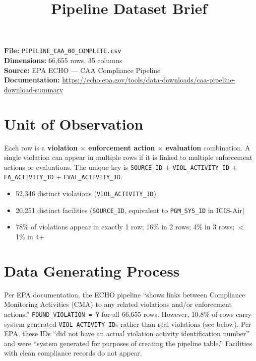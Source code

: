 \documentclass[11pt]{article}
\title{Pipeline Dataset Brief}
\author{}
\date{}
\begin{document}
\maketitle

\noindent\textbf{File:} \texttt{PIPELINE\_CAA\_00\_COMPLETE.csv} \\
\textbf{Dimensions:} 66,655 rows, 35 columns \\
\textbf{Source:} EPA ECHO --- CAA Compliance Pipeline \\
\textbf{Documentation:} \url{https://echo.epa.gov/tools/data-downloads/caa-pipeline-download-summary}

\section{Unit of Observation}

Each row is a \textbf{violation $\times$ enforcement action $\times$ evaluation} combination. A single violation can appear in multiple rows if it is linked to multiple enforcement actions or evaluations. The unique key is \texttt{SOURCE\_ID} + \texttt{VIOL\_ACTIVITY\_ID} + \texttt{EA\_ACTIVITY\_ID} + \texttt{EVAL\_ACTIVITY\_ID}.

\begin{itemize}[nosep]
  \item 52,346 distinct violations (\texttt{VIOL\_ACTIVITY\_ID})
  \item 20,251 distinct facilities (\texttt{SOURCE\_ID}, equivalent to \texttt{PGM\_SYS\_ID} in ICIS-Air)
  \item 78\% of violations appear in exactly 1 row; 16\% in 2 rows; 4\% in 3 rows; $<$1\% in 4+
\end{itemize}

\section{Data Generating Process}

Per EPA documentation, the ECHO pipeline ``shows links between Compliance Monitoring Activities (CMA) to any related violations and/or enforcement actions.'' \texttt{FOUND\_VIOLATION = Y} for all 66,655 rows. However, 10.8\% of rows carry system-generated \texttt{VIOL\_ACTIVITY\_ID}s rather than real violations (see below). Per EPA, these IDs ``did not have an actual violation activity identification number'' and were ``system generated for purposes of creating the pipeline table.'' Facilities with clean compliance records do not appear.
\end{document}
